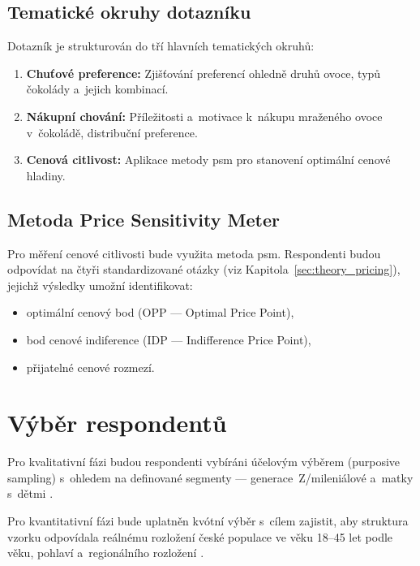 \subsection{Tematické okruhy dotazníku}

Dotazník je strukturován do tří hlavních tematických okruhů:

\begin{enumerate}
  \item \textbf{Chuťové preference:} Zjišťování preferencí ohledně druhů ovoce, typů čokolády a~jejich kombinací.
  \item \textbf{Nákupní chování:} Příležitosti a~motivace k~nákupu mraženého ovoce v~čokoládě, distribuční preference.
  \item \textbf{Cenová citlivost:} Aplikace metody \gls{psm} \parencite{vanwestendorp_1976} pro stanovení optimální cenové hladiny.
\end{enumerate}

\subsection{Metoda Price Sensitivity Meter}

Pro měření cenové citlivosti bude využita metoda \gls{psm}. Respondenti budou odpovídat na čtyři standardizované otázky (viz Kapitola~\ref{sec:theory_pricing}), jejichž výsledky umožní identifikovat:
\begin{itemize}
  \item optimální cenový bod (OPP — Optimal Price Point),
  \item bod cenové indiference (IDP — Indifference Price Point),
  \item přijatelné cenové rozmezí.
\end{itemize}

\section{Výběr respondentů}
\label{sec:meth_sampling}

Pro kvalitativní fázi budou respondenti vybíráni účelovým výběrem (purposive sampling) s~ohledem na definované segmenty — generace~Z/mileniálové a~matky s~dětmi \parencite{morgan_1997}.

Pro kvantitativní fázi bude uplatněn kvótní výběr s~cílem zajistit, aby struktura vzorku odpovídala reálnému rozložení české populace ve věku 18--45 let podle věku, pohlaví a~regionálního rozložení \parencite{czso_spotreba_2024}.

